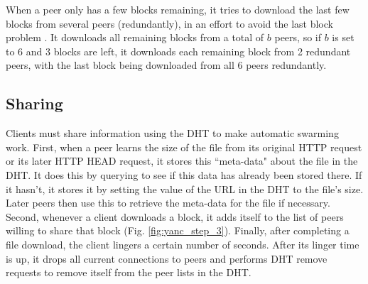 When a peer only has a few blocks remaining, it tries to download the last few blocks from several peers (redundantly), in an effort to avoid the last block problem \cite{last_block}.  
It downloads all remaining blocks from a total of $b$ peers, so if $b$ is set to 6 and 3 blocks are left, it downloads each remaining block from 2 redundant peers, with the
last block being downloaded from all 6 peers redundantly.

\subsection{Sharing}

Clients must share information using the DHT to make automatic swarming work.  First, when a peer learns the size of the file 
from its original HTTP request or its later HTTP HEAD request, it stores this ``meta-data" about the file
in the DHT.  It does this by querying to see if this data has already been stored there.  If it hasn't, it stores it by setting the value of the URL in the DHT to the file's size. 
Later peers then use this to retrieve the meta-data for the file if necessary.
Second, whenever a client downloads a block, it adds itself to the list of peers willing to share that block (Fig. \ref{fig:yanc_step_3}). 
Finally, after completing a file download, the client lingers a certain number of seconds.  After its linger time is up, it drops all current connections to peers 
and performs DHT remove requests to remove itself from the peer lists in the DHT.

